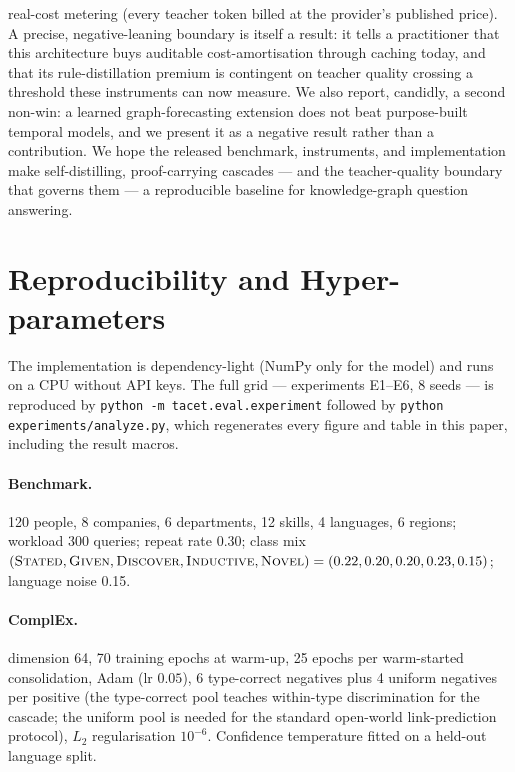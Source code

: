 \documentclass[11pt]{article}
\theoremstyle{plain}
\newcommand{\seeds}{8}
\begin{document}
real-cost metering (every teacher token billed at the provider's published
price). A precise, negative-leaning boundary is itself a result: it tells a
practitioner that this architecture buys auditable cost-amortisation through
caching today, and that its rule-distillation premium is contingent on teacher
quality crossing a threshold these instruments can now measure. We also report,
candidly, a second non-win: a learned graph-forecasting extension does not beat
purpose-built temporal models, and we present it as a negative result rather than
a contribution. We hope the released benchmark, instruments, and implementation
make self-distilling, proof-carrying cascades --- and the teacher-quality
boundary that governs them --- a reproducible baseline for knowledge-graph
question answering.

{\small


}

\appendix
\section{Reproducibility and Hyper-parameters}

The implementation is dependency-light (NumPy only for the model) and runs
on a CPU without API keys. The full grid --- experiments E1--E6, \seeds{}
seeds --- is reproduced by
\texttt{python -m tacet.eval.experiment} followed by
\texttt{python experiments/analyze.py}, which regenerates every figure and
table in this paper, including the result macros.

\paragraph{Benchmark.} 120 people, 8 companies, 6 departments, 12 skills,
4 languages, 6 regions; workload 300 queries; repeat rate 0.30; class mix
$(\textsc{Stated},\textsc{Given},\textsc{Discover},\textsc{Inductive},
\textsc{Novel})=(0.22,0.20,0.20,0.23,0.15)$; language noise 0.15.

\paragraph{ComplEx.} dimension 64, 70 training epochs at warm-up, 25 epochs
per warm-started consolidation, Adam (lr $0.05$), 6 type-correct negatives
plus 4 uniform negatives per positive (the type-correct pool teaches
within-type discrimination for the cascade; the uniform pool is needed for
the standard open-world link-prediction protocol), $L_2$ regularisation
$10^{-6}$. Confidence temperature fitted on a held-out language split.
\end{document}
